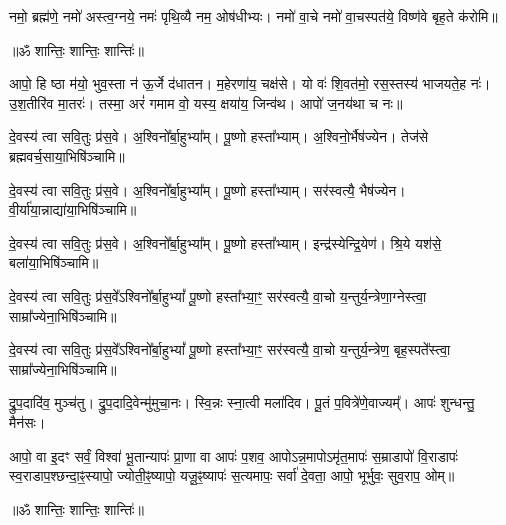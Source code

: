 नमो॒ ब्रह्म॑णे॒ नमो॑ अस्त्व॒ग्नये॒ नमः॑ पृथि॒व्यै नम॒ ओष॑धीभ्यः।
नमो॑ वा॒चे नमो॑ वा॒चस्पत॑ये॒ विष्ण॑वे बृह॒ते क॑रोमि॥

\centerline{॥ॐ शान्तिः॒ शान्तिः॒ शान्तिः॑॥}


आपो॒ हि ष्ठा म॑यो॒ भुव॒स्ता न॑ ऊ॒र्जे द॑धातन।
म॒हेरणा॑य॒ चक्ष॑से। यो वः॑ शि॒वत॑मो॒ रस॒स्तस्य॑ भाजयते॒ह नः॑।
उ॒श॒तीरि॑व मा॒तरः॑। तस्मा॒ अरं॑ गमाम वो॒ यस्य॒ क्षया॑य॒ जिन्व॑थ।
आपो॑ ज॒नय॑था च नः॥

दे॒वस्य॑ त्वा सवि॒तुः प्र॑स॒वे। अ॒श्विनो᳚र्बा॒हुभ्या᳚म्। पू॒ष्णो हस्ता᳚भ्याम्।
अ॒श्विनो॒र्भैष॑ज्येन। तेज॑से ब्रह्मवर्च॒साया॒भिषि॑ञ्चामि॥

दे॒वस्य॑ त्वा सवि॒तुः प्र॑स॒वे। अ॒श्विनो᳚र्बा॒हुभ्या᳚म्। पू॒ष्णो हस्ता᳚भ्याम्।
सर॑स्वत्यै॒ भैष॑ज्येन। वी॒र्या॑या॒न्नाद्या॑या॒भिषि॑ञ्चामि॥

दे॒वस्य॑ त्वा सवि॒तुः प्र॑स॒वे। अ॒श्विनो᳚र्बा॒हुभ्या᳚म्। पू॒ष्णो हस्ता᳚भ्याम्।
इन्द्र॑स्येन्द्रि॒येण॑। श्रि॒ये यश॑से॒ बला॑या॒भिषि॑ञ्चामि॥

दे॒वस्य॑ त्वा सवि॒तुः प्र॑स॒वे᳚ऽश्विनो᳚र्बा॒हुभ्यां᳚ पू॒ष्णो हस्ता᳚भ्या॒ꣳ॒
सर॑स्वत्यै॒ वा॒चो य॒न्तुर्य॒न्त्रेणा॒ग्नेस्त्वा॒ साम्रा᳚ज्येना॒भिषि॑ञ्चामि॥

दे॒वस्य॑ त्वा सवि॒तुः प्र॑स॒वे᳚ऽश्विनो᳚र्बा॒हुभ्यां᳚ पू॒ष्णो हस्ता᳚भ्या॒ꣳ॒
सर॑स्वत्यै॒ वा॒चो य॒न्तुर्य॒न्त्रेण॒ बृह॒स्पते᳚स्त्वा॒ साम्रा᳚ज्येना॒भिषि॑ञ्चामि॥

द्रु॒प॒दादि॑व॒ मुञ्च॑तु। द्रु॒प॒दादि॒वेन्मु॑मुचा॒नः।
स्वि॒न्नः स्ना॒त्वी मला॑दिव। पू॒तं प॒वित्रे॑णे॒वाज्यम्᳚।
आपः॑ शुन्धन्तु॒ मैन॑सः।

आपो॒ वा इ॒दꣳ सर्वं॒ विश्वा॑ भू॒तान्यापः॑ प्रा॒णा वा आपः॑ प॒शव॒ आपोऽन्न॒मापोऽमृ॑त॒मापः॑ स॒म्राडापो॑ वि॒राडापः॑ स्व॒राडाप॒श्छन्दा॒ꣴ॒स्यापो॒ ज्योती॒ꣴ॒ष्यापो॒ यजू॒ꣴ॒ष्यापः॑ स॒त्यमापः॒ सर्वा॑ दे॒वता॒ आपो॒ भूर्भुवः॒ सुव॒राप॒ ओम्॥

\centerline{॥ॐ शान्तिः॒ शान्तिः॒ शान्तिः॑॥}

